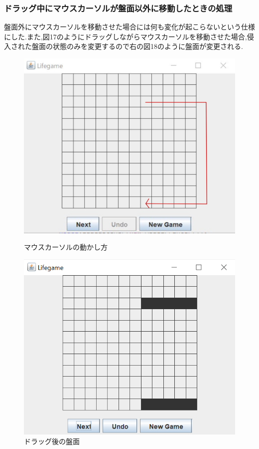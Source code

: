 \documentclass[dvipdfmx]{jarticle}
\begin{document}
\subsubsection{ドラッグ中にマウスカーソルが盤面以外に移動したときの処理}
盤面外にマウスカーソルを移動させた場合には何も変化が起こらないという仕様にした.また,図17のようにドラッグしながらマウスカーソルを移動させた場合,侵入された盤面の状態のみを変更するので右の図18のように盤面が変更される.
\begin{figure}[htbp]
  \begin{minipage}[b]{0.45\linewidth}
    \centering
    \includegraphics[keepaspectratio, scale=0.1]{tegaki.png}
    \caption{マウスカーソルの動かし方}
  \end{minipage}
  \begin{minipage}[b]{0.45\linewidth}
    \centering
    \includegraphics[keepaspectratio, scale=0.4]{after_drag.png}
    \caption{ドラッグ後の盤面}
  \end{minipage}
\end{figure}
\end{document}
